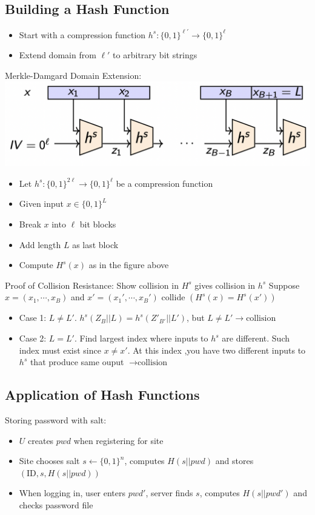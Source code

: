 \subsection*{Building a Hash Function}
\begin{itemize}
    \item Start with a compression function $h^s:\{0,1\}^{\ell'}\rightarrow \{0,1\}^{\ell}$
    \item Extend domain from $\ell'$ to arbitrary bit strings
\end{itemize}

Merkle-Damgard Domain Extension:\\
\includegraphics[width=\columnwidth]{Merkle-Damgard Domain Extension.png}
\begin{itemize}
    \item Let $h^s:\{0,1\}^{2\ell}\rightarrow \{0,1\}^{\ell}$ be 
    a compression function
    \item Given input $x\in\{0,1\}^L$
    \item Break $x$ into $\ell$ bit blocks
    \item Add length $L$ as last block
    \item Compute $H^s(x)$ as in the figure above
\end{itemize}
Proof of Collision Resistance: Show collision in $H^s$ gives collision in $h^s$
Suppose $x=(x_1,\cdots,x_B)$ and $x'=(x_1',\cdots,x_B')$ collide
$(H^s(x)=H^s(x'))$
\begin{itemize}
    \item Case 1: $L\neq L'$. $h^s(Z_B||L)=h^s(Z'_{B'}||L')$,
     but $L\neq L'\rightarrow \text{collision}$
    \item Case 2: $L=L'$. Find largest index where inputs to $h^s$ are different.
    Such index must exist since $x\neq x'$. At this index ,you have two different
    inputs to $h^s$ that produce same ouput $\rightarrow \text{collision}$
\end{itemize}

\subsection*{Application of Hash Functions}
Storing password with salt:
\begin{itemize}
    \item $U$ creates $pwd$ when registering for site
    \item Site chooses salt $s\leftarrow \{0,1\}^n$, computes $H(s||pwd)$ and
    stores $(\text{ID},s,H(s||pwd))$
    \item When logging in, user enters $pwd'$, server finds $s$, computes
    $H(s||pwd')$ and checks password file
\end{itemize}


